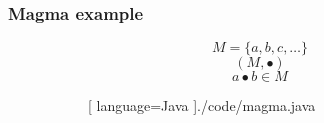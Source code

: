 \begin{frame}
  \frametitle{Magma example}
  \begin{figure}[H]
    \begin{subfigure}[h]{0.45\textwidth}
      \begin{equation}
        M = \{ a, b, c, \dots \}
      \end{equation}
      \begin{equation}
        (M, \bullet)
      \end{equation}
      \begin{equation}
        a \bullet b \in M
      \end{equation}
    \end{subfigure}
    \hfill
    \begin{subfigure}[h]{0.45\textwidth}
      \begin{center}
      
      [ language=Java
      ]{./code/magma.java}
  \end{center}
    \end{subfigure}
  \end{figure}
\end{frame}

\hidelogo

